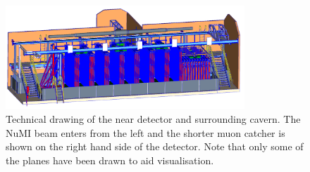 \begin{figure}
  \centering
  \includegraphics[width=0.8\textwidth]{../../img/baird/det/ND_01.png}
  \caption{Technical drawing of the near detector and surrounding
    cavern. The NuMI beam enters from the left and the shorter muon
    catcher is shown on the right hand side of the detector. Note that
    only some of the planes have been drawn to aid visualisation.}
  \label{fig:neardet}
\end{figure}







